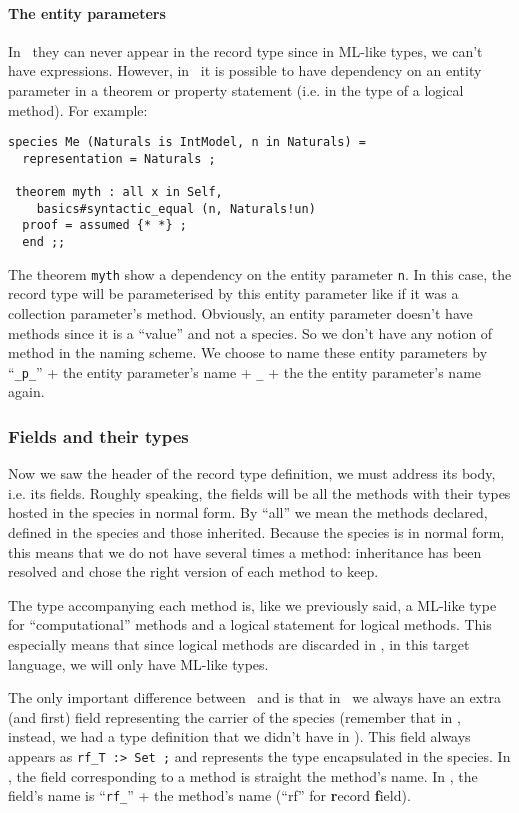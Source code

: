 \medskip
\paragraph{The entity parameters} In \ocaml\ they can never appear in
the record type since in ML-like types, we can't have expressions. 
However, in \coq\ it is possible to have dependency on an entity
parameter in a theorem or property statement (i.e. in the type of a
logical method). For example:
{\scriptsize
\begin{lstlisting}
species Me (Naturals is IntModel, n in Naturals) =
  representation = Naturals ;

 theorem myth : all x in Self,
    basics#syntactic_equal (n, Naturals!un)
  proof = assumed {* *} ;
  end ;;
\end{lstlisting}
}
The theorem {\tt myth} show a dependency on the entity parameter
{\tt n}. In this case, the record type will be parameterised by this
entity parameter like if it was a collection parameter's
method. Obviously, an entity parameter doesn't have methods since it
is a ``value'' and not a species. So we don't have any notion of
method in the naming scheme. We choose to name these entity parameters
by ``{\tt \_p\_}'' + the entity parameter's name  + {\tt \_} + the
the entity parameter's name again.

\subsubsection{Fields and their types}
Now we saw the header of the record type definition, we must address
its body, i.e. its fields. Roughly speaking, the fields will be all
the methods with their types hosted in the species in normal form. By
``all'' we mean the methods declared, defined in the species and those
inherited. Because the species is in normal form, this means that we
do not have several times a method: inheritance has been resolved and
chose the right version of each method to keep.

The type accompanying each method is, like we previously said, a
ML-like type for ``computational'' methods and a logical statement for
logical methods. This especially means that since logical methods are
discarded in \ocaml, in this target language, we will only have
ML-like types.

The only important difference between \ocaml\ and \coq is that in
\coq\ we always have an extra (and first) field representing the
carrier of the species (remember that in \ocaml, instead, we had a
type definition that we didn't have in \coq). This field always
appears as {\tt  rf\_T :> Set ;} and represents the type encapsulated
in the species. In \ocaml, the field corresponding to a method is
straight the method's name. In \coq, the field's name is
``{\tt rf\_}'' + the method's name (``rf'' for {\bf r}ecord
{\bf f}ield).

